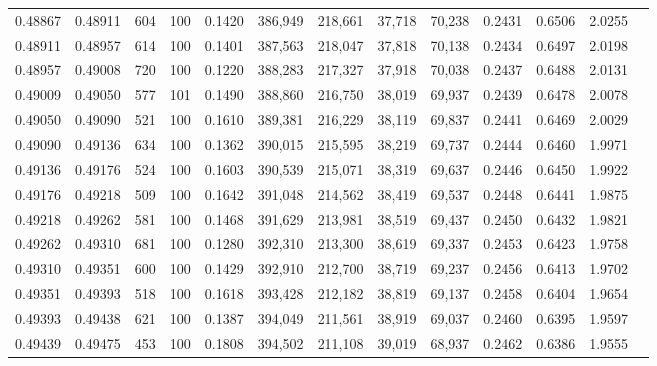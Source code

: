\begin{tabular}{rrrrrrrrrrrrr}
0.48867 & 0.48911 &   604 & 100 &                                     0.1420 & 386,949 & 218,661 &  37,718 &  70,238 & 0.2431 & 0.6506 & 2.0255 \\
0.48911 & 0.48957 &   614 & 100 &                                     0.1401 & 387,563 & 218,047 &  37,818 &  70,138 & 0.2434 & 0.6497 & 2.0198 \\
0.48957 & 0.49008 &   720 & 100 &                                     0.1220 & 388,283 & 217,327 &  37,918 &  70,038 & 0.2437 & 0.6488 & 2.0131 \\
0.49009 & 0.49050 &   577 & 101 &                                     0.1490 & 388,860 & 216,750 &  38,019 &  69,937 & 0.2439 & 0.6478 & 2.0078 \\
0.49050 & 0.49090 &   521 & 100 &                                     0.1610 & 389,381 & 216,229 &  38,119 &  69,837 & 0.2441 & 0.6469 & 2.0029 \\
0.49090 & 0.49136 &   634 & 100 &                                     0.1362 & 390,015 & 215,595 &  38,219 &  69,737 & 0.2444 & 0.6460 & 1.9971 \\
0.49136 & 0.49176 &   524 & 100 &                                     0.1603 & 390,539 & 215,071 &  38,319 &  69,637 & 0.2446 & 0.6450 & 1.9922 \\
0.49176 & 0.49218 &   509 & 100 &                                     0.1642 & 391,048 & 214,562 &  38,419 &  69,537 & 0.2448 & 0.6441 & 1.9875 \\
0.49218 & 0.49262 &   581 & 100 &                                     0.1468 & 391,629 & 213,981 &  38,519 &  69,437 & 0.2450 & 0.6432 & 1.9821 \\
0.49262 & 0.49310 &   681 & 100 &                                     0.1280 & 392,310 & 213,300 &  38,619 &  69,337 & 0.2453 & 0.6423 & 1.9758 \\
0.49310 & 0.49351 &   600 & 100 &                                     0.1429 & 392,910 & 212,700 &  38,719 &  69,237 & 0.2456 & 0.6413 & 1.9702 \\
0.49351 & 0.49393 &   518 & 100 &                                     0.1618 & 393,428 & 212,182 &  38,819 &  69,137 & 0.2458 & 0.6404 & 1.9654 \\
0.49393 & 0.49438 &   621 & 100 &                                     0.1387 & 394,049 & 211,561 &  38,919 &  69,037 & 0.2460 & 0.6395 & 1.9597 \\
0.49439 & 0.49475 &   453 & 100 &                                     0.1808 & 394,502 & 211,108 &  39,019 &  68,937 & 0.2462 & 0.6386 & 1.9555 \\

\end{tabular}
